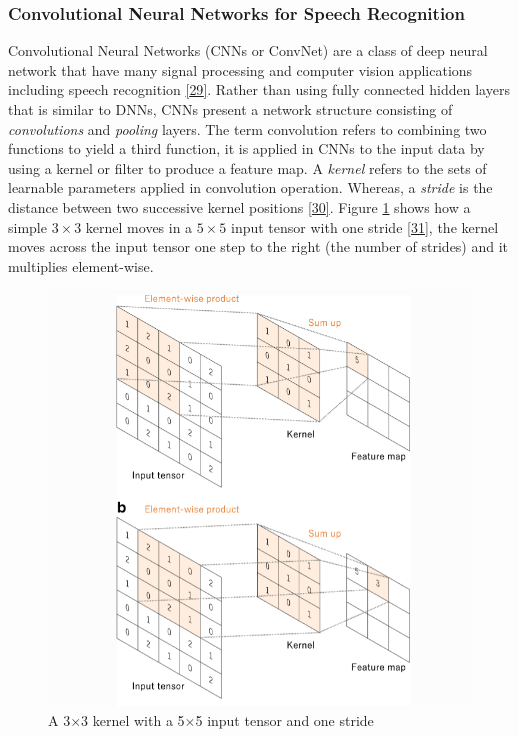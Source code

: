 \documentclass[
  a4paper,
]{article}
\begin{document}
\subsubsection{Convolutional Neural Networks for Speech Recognition}  
\label{section:cnn}

Convolutional Neural Networks (CNNs or ConvNet) are a class of deep
neural network that have many signal processing and computer vision
applications including speech recognition
\protect\hyperlink{ref-6857341}{{[}29{]}}. Rather than using fully
connected hidden layers that is similar to DNNs, CNNs present a network
structure consisting of \emph{convolutions} and \emph{pooling} layers.
The term convolution refers to combining two functions to yield a third
function, it is applied in CNNs to the input data by using a kernel or
filter to produce a feature map. A \emph{kernel} refers to the sets of
learnable parameters applied in convolution operation. Whereas, a
\emph{stride} is the distance between two successive kernel positions
\protect\hyperlink{ref-Yamashita2018}{{[}30{]}}. Figure \ref{fig:kernel}
shows how a simple \(3\times3\) kernel moves in a \(5\times5\) input
tensor with one stride \protect\hyperlink{ref-kernel}{{[}31{]}}, the
kernel moves across the input tensor one step to the right (the number
of strides) and it multiplies element-wise.

\begin{figure}

{\centering \includegraphics{kernel} 

}

\caption{A 3$\times$3 kernel with a 5$\times$5 input tensor and one stride}\label{fig:kernel}
\end{figure}
\end{document}
